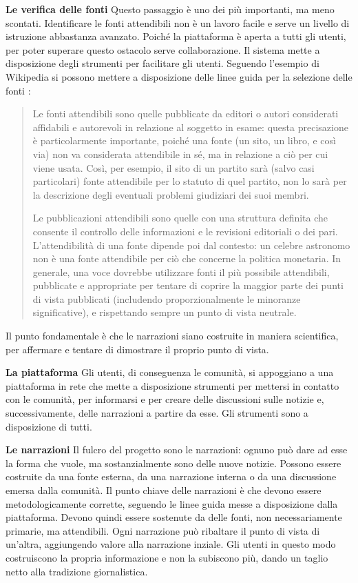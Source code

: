 \documentclass{article}
\begin{document}
\textbf{Le verifica delle fonti} Questo passaggio è uno dei più importanti, ma meno scontati. Identificare le fonti attendibili non è un lavoro facile e serve un livello di istruzione abbastanza avanzato. Poiché la piattaforma è aperta a tutti gli utenti, per poter superare questo ostacolo serve collaborazione. Il sistema mette a disposizione degli strumenti per facilitare gli utenti. Seguendo l'esempio di Wikipedia si possono mettere a disposizione delle linee guida per la selezione delle fonti \parencite{noauthor_wikipedia:fonti_2018}:
\begin{quote}
Le fonti attendibili sono quelle pubblicate da editori o autori considerati affidabili e autorevoli in relazione al soggetto in esame: questa precisazione è particolarmente importante, poiché una fonte (un sito, un libro, e così via) non va considerata attendibile in sé, ma in relazione a ciò per cui viene usata. Così, per esempio, il sito di un partito sarà (salvo casi particolari) fonte attendibile per lo statuto di quel partito, non lo sarà per la descrizione degli eventuali problemi giudiziari dei suoi membri.

Le pubblicazioni attendibili sono quelle con una struttura definita che consente il controllo delle informazioni e le revisioni editoriali o dei pari. L’attendibilità di una fonte dipende poi dal contesto: un celebre astronomo non è una fonte attendibile per ciò che concerne la politica monetaria. In generale, una voce dovrebbe utilizzare fonti il più possibile attendibili, pubblicate e appropriate per tentare di coprire la maggior parte dei punti di vista pubblicati (includendo proporzionalmente le minoranze significative), e rispettando sempre un punto di vista neutrale.
\end{quote}

Il punto fondamentale è che le narrazioni siano costruite in maniera scientifica, per affermare e tentare di dimostrare il proprio punto di vista.

\vspace{0.5 cm}

\textbf{La piattaforma} Gli utenti, di conseguenza le comunità, si appoggiano a una piattaforma in rete che mette a disposizione strumenti per mettersi in contatto con le comunità, per informarsi e per creare delle discussioni sulle notizie e, successivamente, delle narrazioni a partire da esse. Gli strumenti sono a disposizione di tutti.

\vspace{0.5 cm}

\textbf{Le narrazioni} Il fulcro del progetto sono le narrazioni: ognuno può dare ad esse la forma che vuole, ma sostanzialmente sono delle nuove notizie. Possono essere costruite da una fonte esterna, da una narrazione interna o da una discussione emersa dalla comunità. Il punto chiave delle narrazioni è che devono essere metodologicamente corrette, seguendo le linee guida messe a disposizione dalla piattaforma. Devono quindi essere sostenute da delle fonti, non necessariamente primarie, ma attendibili. Ogni narrazione può ribaltare il punto di vista di un’altra, aggiungendo valore alla narrazione inziale. Gli utenti in questo modo costruiscono la propria informazione e non la subiscono più, dando un taglio netto alla tradizione giornalistica.
\end{document}
